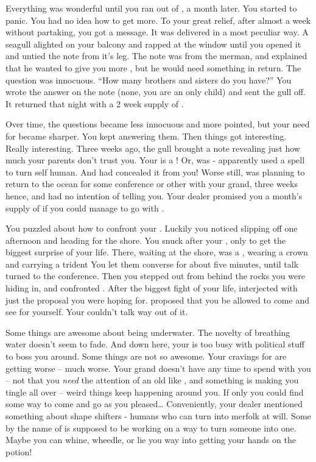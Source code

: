 \documentclass[char]{NeptuneBall}
\begin{document}
Everything was wonderful until you ran out of \iDrug{\MYname}, a month later. You started to panic. You had no idea how to get more. To your great relief, after almost a week without partaking, you got a message. It was delivered in a most peculiar way. A seagull alighted on your balcony and rapped at the window until you opened it and untied the note from it's leg. The note was from the merman, and explained that he wanted to give you more \iDrug{\MYname}, but he would need something in return.  The question was innocuous. ``How many brothers and sisters do you have?'' You wrote the answer on the note (none, you are an only child) and sent the gull off. It returned that night with a 2 week supply of \iDrug{\MYname}.

Over time, the questions became less innocuous and more pointed, but your need for \iDrug{\MYname} became sharper. You kept answering them. Then things got interesting. Really interesting. Three weeks ago, the gull brought a note revealing just how much your parents don't trust you. Your \cAriel{\parent} \cAriel{} is a \cAriel{\mer}! Or, was - apparently \cAriel{\they} used a spell to turn \cAriel{\their}self human. And \cAriel{\they} had concealed it from you! Worse still, \cAriel{} was planning to return to the ocean for some conference or other with your grand\cKing{\parent}, three weeks hence, and had no intention of telling you. Your dealer promised you a month's supply of \iDrug{\MYname} if you could manage to go with \cAriel{\them}.

You puzzled about how to confront your \cAriel{\parent}. Luckily you noticed \cAriel{\them} slipping off one afternoon and heading for the shore. You snuck after your \cAriel{\parent}, only to get the biggest surprise of your life. There, waiting at the shore, was a , wearing a crown and carrying a trident You let them converse for about five minutes, until talk turned to the conference. Then you stepped out from behind the rocks you were hiding in, and confronted \cAriel{}. After the biggest fight of your life, \cKing{} interjected with just the proposal you were hoping for. \cKing{\They} proposed that you be allowed to come and see \pAtlantis{} for yourself. Your \cAriel{\parent} couldn't talk \cAriel{\their} way out of it.

Some things are awesome about being underwater. The novelty of breathing water doesn't seem to fade. And down here, your \cAriel{\parent} is too busy with political stuff to boss you around. Some things are not so awesome. Your cravings for \iDrug{\MYname} are getting worse -- much worse. Your grand\cKing{\parent} doesn't have any time to spend with you -- not that you \emph{need} the attention of an old \cKing{\mer} like \cKing{\them}, and something is making you tingle all over -- weird things keep happening around you. If only you could find some way to come and go as you pleased\ldots{} Conveniently, your dealer mentioned something about shape shifters - humans who can turn into merfolk at will. Some \cManta{\mer} by the name of \cManta{} is supposed to be working on a way to turn someone into one. Maybe you can whine, wheedle, or lie you way into getting your hands on the potion!
\end{document}
